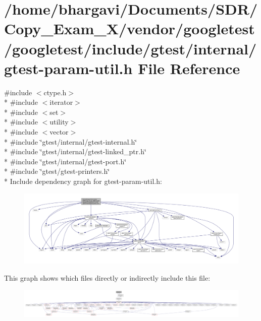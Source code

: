 \hypertarget{gtest-param-util_8h}{}\section{/home/bhargavi/\+Documents/\+S\+D\+R/\+Copy\+\_\+\+Exam\+\_\+X/vendor/googletest/googletest/include/gtest/internal/gtest-\/param-\/util.h File Reference}
\label{gtest-param-util_8h}
{\ttfamily \#include $<$ctype.\+h$>$}\\*
{\ttfamily \#include $<$iterator$>$}\\*
{\ttfamily \#include $<$set$>$}\\*
{\ttfamily \#include $<$utility$>$}\\*
{\ttfamily \#include $<$vector$>$}\\*
{\ttfamily \#include \char`\"{}gtest/internal/gtest-\/internal.\+h\char`\"{}}\\*
{\ttfamily \#include \char`\"{}gtest/internal/gtest-\/linked\+\_\+ptr.\+h\char`\"{}}\\*
{\ttfamily \#include \char`\"{}gtest/internal/gtest-\/port.\+h\char`\"{}}\\*
{\ttfamily \#include \char`\"{}gtest/gtest-\/printers.\+h\char`\"{}}\\*
Include dependency graph for gtest-\/param-\/util.h\+:
\nopagebreak
\begin{figure}[H]
\begin{center}
\leavevmode
\includegraphics[width=350pt]{gtest-param-util_8h__incl}
\end{center}
\end{figure}
This graph shows which files directly or indirectly include this file\+:
\nopagebreak
\begin{figure}[H]
\begin{center}
\leavevmode
\includegraphics[width=350pt]{gtest-param-util_8h__dep__incl}
\end{center}
\end{figure}
